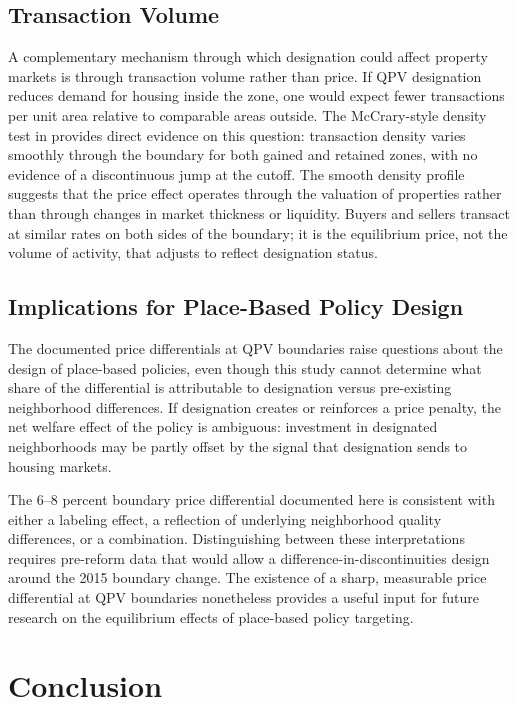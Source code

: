 \documentclass[12pt]{article}
\begin{document}
\subsection{Transaction Volume}

A complementary mechanism through which designation could affect property markets is through transaction volume rather than price. If QPV designation reduces demand for housing inside the zone, one would expect fewer transactions per unit area relative to comparable areas outside. The McCrary-style density test in  provides direct evidence on this question: transaction density varies smoothly through the boundary for both gained and retained zones, with no evidence of a discontinuous jump at the cutoff. The smooth density profile suggests that the price effect operates through the valuation of properties rather than through changes in market thickness or liquidity. Buyers and sellers transact at similar rates on both sides of the boundary; it is the equilibrium price, not the volume of activity, that adjusts to reflect designation status.

\subsection{Implications for Place-Based Policy Design}

The documented price differentials at QPV boundaries raise questions about the design of place-based policies, even though this study cannot determine what share of the differential is attributable to designation versus pre-existing neighborhood differences. If designation creates or reinforces a price penalty, the net welfare effect of the policy is ambiguous: investment in designated neighborhoods may be partly offset by the signal that designation sends to housing markets.

The 6--8 percent boundary price differential documented here is consistent with either a labeling effect, a reflection of underlying neighborhood quality differences, or a combination. Distinguishing between these interpretations requires pre-reform data that would allow a difference-in-discontinuities design around the 2015 boundary change. The existence of a sharp, measurable price differential at QPV boundaries nonetheless provides a useful input for future research on the equilibrium effects of place-based policy targeting.


\section{Conclusion} \label{sec:conclusion}
\end{document}
